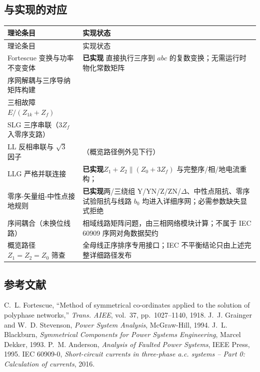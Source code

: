 \subsection{与实现的对应}
\begin{center}\footnotesize
\begin{longtable}{@{}L{6.4cm}L{9.0cm}@{}}
\toprule
理论条目 & 实现状态\\
\midrule
\endfirsthead
\toprule
理论条目 & 实现状态\\
\midrule
\endhead
Fortescue 变换与功率不变变体 &
\textbf{已实现}\quad {} 直接执行三序到 $abc$ 的复数变换；无需运行时物化常数矩阵\\
序网解耦与三序导纳矩阵构建 &
\\
三相故障 $E/(Z_{1k}{+}Z_f)$ &
\\
SLG 三序串联（$3Z_f$ 入零序支路） &
\\
LL 反相串联与 $\sqrt3$ 因子 &
（概览路径例外见下行）\\
LLG 严格并联连接 &
\textbf{已实现}\quad $Z_1{+}Z_2\parallel(Z_0{+}3Z_f)$ 与完整序/相/地电流重构；\\
零序-矢量组-中性点接地规则 &
\textbf{已实现}\quad 两/三绕组 Y/YN/Z/ZN/$\Delta$、中性点阻抗、零序试验阻抗与线路 $b_0$ 均进入详细序网；必需参数缺失显式拒绝\\
序间耦合（未换位线路） & 相域线路矩阵问题，由三相网络模块计算；不属于 IEC 60909 序网对角数据契约\\
概览路径 $Z_1{=}Z_2{=}Z_0$ 筛查 & 全母线正序排序专用接口；IEC 不平衡结论只由上述完整详细路径发布\\
\bottomrule
\end{longtable}
\end{center}

\subsection{参考文献}
{\renewcommand{\section}[2]{}%
\begin{thebibliography}{9}\small
{} C.~L. Fortescue, ``Method of symmetrical co-ordinates
applied to the solution of polyphase networks,'' \emph{Trans. AIEE}, vol.~37,
pp.~1027--1140, 1918.
 J.~J. Grainger and W.~D. Stevenson, \emph{Power System
Analysis}, McGraw-Hill, 1994.
 J.~L. Blackburn, \emph{Symmetrical Components for Power
Systems Engineering}, Marcel Dekker, 1993.
 P.~M. Anderson, \emph{Analysis of Faulted Power Systems},
IEEE Press, 1995.
 IEC 60909-0, \emph{Short-circuit currents in three-phase
a.c. systems -- Part 0: Calculation of currents}, 2016.
\end{thebibliography}}

